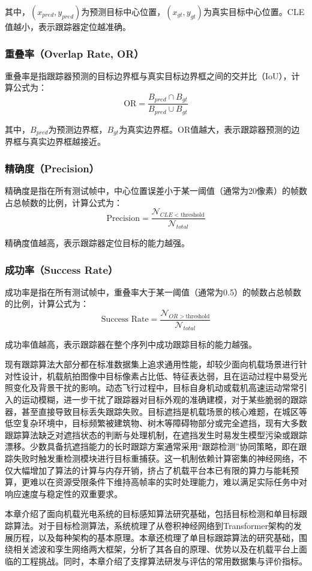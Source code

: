 其中，$(x_{pred}, y_{pred})$为预测目标中心位置，$(x_{gt}, y_{gt})$为真实目标中心位置。CLE值越小，表示跟踪器定位越准确。

\subsubsection{重叠率（Overlap Rate, OR）}
重叠率是指跟踪器预测的目标边界框与真实目标边界框之间的交并比（IoU），计算公式为：
\begin{equation}
    \text{OR} = \frac{B_{pred} \cap B_{gt}}{B_{pred} \cup B_{gt}}
\end{equation}

其中，$B_{pred}$为预测边界框，$B_{gt}$为真实边界框。OR值越大，表示跟踪器预测的边界框与真实边界框越接近。

\subsubsection{精确度（Precision）}
精确度是指在所有测试帧中，中心位置误差小于某一阈值（通常为20像素）的帧数占总帧数的比例，计算公式为：
\begin{equation}
    \text{Precision} = \frac{\mathcal{N}_{CLE < \text{threshold}}}{\mathcal{N}_{total}}
\end{equation}

精确度值越高，表示跟踪器定位目标的能力越强。

\subsubsection{成功率（Success Rate）}
成功率是指在所有测试帧中，重叠率大于某一阈值（通常为0.5）的帧数占总帧数的比例，计算公式为：
\begin{equation}
    \text{Success Rate} = \frac{\mathcal{N}_{OR > \text{threshold}}}{\mathcal{N}_{total}}
\end{equation}

成功率值越高，表示跟踪器在整个序列中成功跟踪目标的能力越强。

现有跟踪算法大部分都在标准数据集上追求通用性能，却较少面向机载场景进行针对性设计，机载航拍图像中目标像素占比低、特征表达弱，且在运动过程中易受光照变化及背景干扰的影响。动态飞行过程中，目标自身机动或载机高速运动常常引入的运动模糊，进一步干扰了跟踪器对目标外观的准确建模，对于某些脆弱的跟踪器，甚至直接导致目标丢失跟踪失败。目标遮挡是机载场景的核心难题，在城区等低空复杂环境中，目标频繁被建筑物、树木等障碍物部分或完全遮挡，现有大多数跟踪算法缺乏对遮挡状态的判断与处理机制，在遮挡发生时易发生模型污染或跟踪漂移。少数具备抗遮挡能力的长时跟踪方案通常采用“跟踪检测”协同策略，即在跟踪失败时触发重检测模块进行目标重捕获。这一机制依赖计算密集的神经网络，不仅大幅增加了算法的计算与内存开销，挤占了机载平台本已有限的算力与能耗预算，更难以在资源受限条件下维持高帧率的实时处理能力，难以满足实际任务中对响应速度与稳定性的双重要求。

本章介绍了面向机载光电系统的目标感知算法研究基础，包括目标检测和单目标跟踪算法。对于目标检测算法，系统梳理了从卷积神经网络到Transformer架构的发展历程，以及每种架构的基本原理。本章还梳理了单目标跟踪算法的研究基础，围绕相关滤波和孪生网络两大框架，分析了其各自的原理、优势以及在机载平台上面临的工程挑战。同时，本章介绍了支撑算法研发与评估的常用数据集与评价指标。

